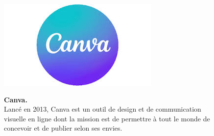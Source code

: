 \begin{figure}[H]
    \centering
    \begin{minipage}[c]{0.3\textwidth}
        \includegraphics[width=\linewidth]{projet/images/diagramme de sequance/images/téléchargement.jpg}
    \end{minipage}
    \hspace{1cm}
    \begin{minipage}[c]{0.6\textwidth}
        \textbf{Canva.}\\[0.5em]
        Lancé en 2013, Canva est un outil de design et de communication visuelle en ligne dont la mission est de permettre à tout le monde de concevoir et de publier selon ses envies.\cite{ref27}
    \end{minipage}
\end{figure}

\
